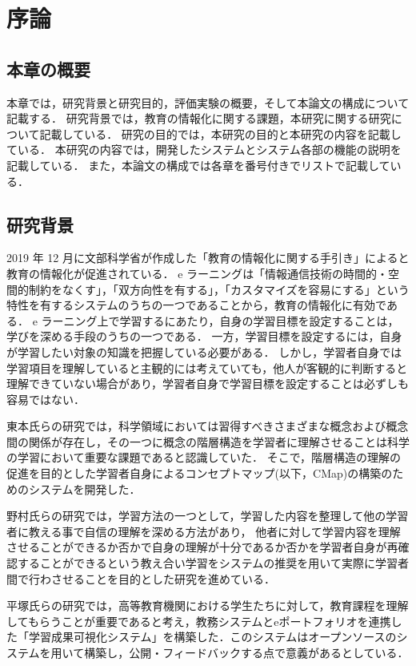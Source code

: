\section{序論}\label{sec1}
\subsection{本章の概要}
本章では，研究背景と研究目的，評価実験の概要，そして本論文の構成について記載する．
研究背景では，教育の情報化に関する課題，本研究に関する研究について記載している．
研究の目的では，本研究の目的と本研究の内容を記載している．
本研究の内容では，開発したシステムとシステム各部の機能の説明を記載している．
また，本論文の構成では各章を番号付きでリストで記載している．

\subsection{研究背景}
2019 年 12 月に文部科学省が作成した「教育の情報化に関する手引き」\cite{tebiki}によると教育の情報化が促進されている．
e ラーニング\cite{e}は「情報通信技術の時間的・空間的制約をなくす」，「双方向性を有する」，「カスタマイズを容易にする」という特性を有するシステムのうちの一つであることから，教育の情報化に有効である．
e ラーニング上で学習するにあたり，自身の学習目標を設定することは，学びを深める手段のうちの一つである\cite{seman}．
一方，学習目標を設定するには，自身が学習したい対象の知識を把握している必要がある．
しかし，学習者自身では学習項目を理解していると主観的には考えていても，他人が客観的に判断すると理解できていない場合があり，学習者自身で学習目標を設定することは必ずしも容易ではない．

東本氏らの研究では，科学領域においては習得すべきさまざまな概念および概念間の関係が存在し，その一つに概念の階層構造を学習者に理解させることは科学の学習において重要な課題であると認識していた．
そこで，階層構造の理解の促進を目的とした学習者自身によるコンセプトマップ(以下，CMap)\cite{concept}の構築のためのシステムを開発した\cite{toumoto}．

野村氏らの研究では，学習方法の一つとして，学習した内容を整理して他の学習者に教える事で自信の理解を深める方法があり，
他者に対して学習内容を理解させることができるか否かで自身の理解が十分であるか否かを学習者自身が再確認することができるという教え合い学習をシステムの推奨を用いて実際に学習者間で行わさせることを目的とした研究を進めている\cite{nomura}．

平塚氏らの研究では，高等教育機関における学生たちに対して，教育課程を理解してもらうことが重要であると考え，教務システムとeポートフォリオを連携した「学習成果可視化システム」を構築した．このシステムはオープンソースのシステムを用いて構築し，公開・フィードバックする点で意義があるとしている\cite{hira}．

